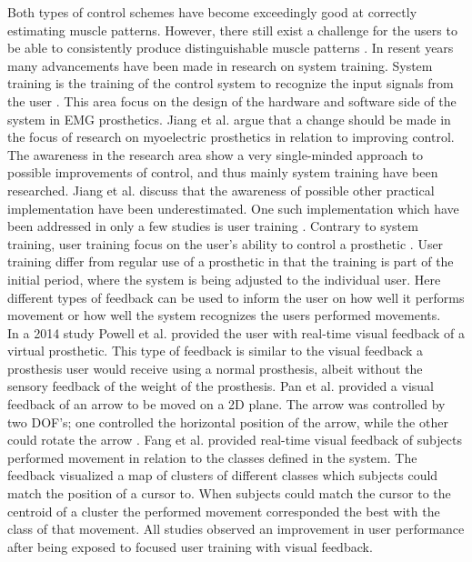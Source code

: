 Both types of control schemes have become exceedingly good at correctly estimating muscle patterns. \cite{Hahne2014, Bruun2017, Englehart2003, Scheme2015} However, there still exist a challenge for the users to be able to consistently produce distinguishable muscle patterns \cite{Powell2014}. In resent years many advancements have been made in research on system training. System training is the training of the control system to recognize the input signals from the user \cite{Fougner2012}. This area focus on the design of the hardware and software side of the system in EMG prosthetics. Jiang et al. \cite{Jiang2012} argue that a change should be made in the focus of research on myoelectric prosthetics in relation to improving control. The awareness in the research area show a very single-minded approach to possible improvements of control, and thus mainly system training have been researched. Jiang et al. \cite{Jiang2012} discuss that the awareness of possible other practical implementation have been underestimated. One such implementation which have been addressed in only a few studies is user training \cite{Fang2017, Powell2014, Pan2017}. Contrary to system training, user training focus on the user's ability to control a prosthetic \cite{Fougner2012}. User training differ from regular use of a prosthetic in that the training is part of the initial period, where the system is being adjusted to the individual user. Here different types of feedback can be used to inform the user on how well it performs movement or how well the system recognizes the users performed movements. \cite{Powell2014,Simon2013} \\
In a 2014 study Powell et al. \cite{Powell2014} provided the user with real-time visual feedback of a virtual prosthetic. This type of feedback is similar to the visual feedback a prosthesis user would receive using a normal prosthesis, albeit without the sensory feedback of the weight of the prosthesis. Pan et al. \cite{Pan2017} provided a visual feedback of an arrow to be moved on a 2D plane. The arrow was controlled by two DOF's; one controlled the horizontal position of the arrow, while the other could rotate the arrow \cite{Pan2017}. Fang et al. \cite{Fang2017} provided real-time visual feedback of subjects performed movement in relation to the classes defined in the system. The feedback visualized a map of clusters of different classes which subjects could match the position of a cursor to. When subjects could match the cursor to the centroid of a cluster the performed movement corresponded the best with the class of that movement. \cite{Fang2017} All studies observed an improvement in user performance after being exposed to focused user training with visual feedback. 

